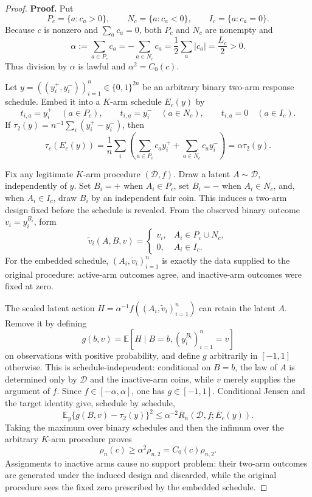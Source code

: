 \documentclass{article}
\begin{document}
\begin{proof}
\textbf{Proof.}
Put
\[
 P_c=\{a:c_a>0\},\qquad N_c=\{a:c_a<0\},\qquad I_c=\{a:c_a=0\}.
\]
Because \(c\) is nonzero and \(\sum_a c_a=0\), both \(P_c\) and \(N_c\) are nonempty and
\[
 \alpha:=\sum_{a\in P_c}c_a=-\sum_{a\in N_c}c_a
 =\frac12\sum_a|c_a|=\frac{L_c}{2}>0.
\]
Thus division by \(\alpha\) is lawful and \(\alpha^2=C_0(c)\).

Let \(y=((y_i^+,y_i^-))_{i=1}^n\in\{0,1\}^{2n}\) be an arbitrary binary two-arm response schedule. Embed it into a \(K\)-arm schedule \(E_c(y)\) by
\[
 t_{i,a}=y_i^+\quad(a\in P_c),\qquad
 t_{i,a}=y_i^-\quad(a\in N_c),\qquad
 t_{i,a}=0\quad(a\in I_c).
\]
If \(\tau_2(y)=n^{-1}\sum_i(y_i^+-y_i^-)\), then
\[
 \tau_c(E_c(y))
 =\frac1n\sum_i\left(\sum_{a\in P_c}c_ay_i^+
 +\sum_{a\in N_c}c_ay_i^-\right)
 =\alpha\tau_2(y).
\]

Fix any legitimate \(K\)-arm procedure \((\mathcal D,f)\). Draw a latent \(A\sim\mathcal D\), independently of \(y\). Set \(B_i=+\) when \(A_i\in P_c\), set \(B_i=-\) when \(A_i\in N_c\), and, when \(A_i\in I_c\), draw \(B_i\) by an independent fair coin. This induces a two-arm design fixed before the schedule is revealed. From the observed binary outcome \(v_i=y_i^{B_i}\), form
\[
 \widetilde v_i(A,B,v)=
 \begin{cases}
 v_i,&A_i\in P_c\cup N_c,\\
 0,&A_i\in I_c.
 \end{cases}
\]
For the embedded schedule, \((A_i,\widetilde v_i)_{i=1}^n\) is exactly the data supplied to the original procedure: active-arm outcomes agree, and inactive-arm outcomes were fixed at zero.

The scaled latent action \(H=\alpha^{-1}f((A_i,\widetilde v_i)_{i=1}^n)\) can retain the latent \(A\). Remove it by defining
\[
 g(b,v)=\mathbb E\!\left[H\mid B=b,(y_i^{B_i})_{i=1}^n=v\right]
\]
on observations with positive probability, and define \(g\) arbitrarily in \([-1,1]\) otherwise. This is schedule-independent: conditional on \(B=b\), the law of \(A\) is determined only by \(\mathcal D\) and the inactive-arm coins, while \(v\) merely supplies the argument of \(f\). Since \(f\in[-\alpha,\alpha]\), one has \(g\in[-1,1]\). Conditional Jensen and the target identity give, schedule by schedule,
\[
 \mathbb E_y\{g(B,v)-\tau_2(y)\}^2
 \leq\alpha^{-2}R_n(\mathcal D,f;E_c(y)).
\]
Taking the maximum over binary schedules and then the infimum over the arbitrary \(K\)-arm procedure proves
\[
 \rho_n(c)\geq\alpha^2\rho_{n,2}=C_0(c)\rho_{n,2}.
\]
Assignments to inactive arms cause no support problem: their two-arm outcomes are generated under the induced design and discarded, while the original procedure sees the fixed zero prescribed by the embedded schedule.


\end{proof}
\end{document}
